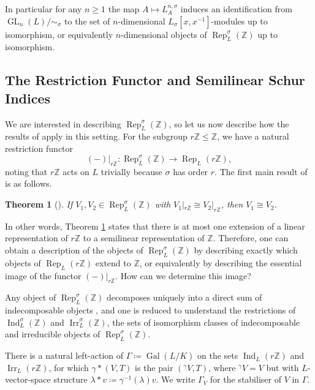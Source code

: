 \documentclass[10pt, reqno, hidelinks]{amsart}
\DeclareMathOperator{\Gal}{Gal}
\DeclareMathOperator{\Rep}{Rep}
\DeclareMathOperator{\Ind}{Ind}
\DeclareMathOperator{\Irr}{Irr}
\DeclareMathOperator{\GL}{GL}
\newcommand{\bZ}{{\mathbb Z}}
\newtheorem{thm}{Theorem}
\numberwithin{thm}{subsection}
\theoremstyle{definition}
\begin{document}
In particular for any $n \geq 1$ the map $A \mapsto L^{n, \sigma}_A$ induces an identification from $\GL_n(L) / \!\! \sim_{\sigma}$ to the set of $n$-dimensional $L_{\sigma}[x,x^{-1}]$-modules up to isomorphism, or equivalently $n$-dimensional objects of $\Rep_L^{\sigma}(\bZ)$ up to isomorphism.

\subsection{The Restriction Functor and Semilinear Schur Indices}\label{sect:backgroundsemilinearreps}

We are interested in describing $\Rep_L^{\sigma}(\bZ)$, so let us now describe how the results of \cite{TAYSchur} apply in this setting. For the subgroup $r \bZ \leq \bZ$, we have a natural restriction functor
\[
(-)|_{r \bZ} \colon \Rep_L^{\sigma}(\bZ) \rightarrow \Rep_L(r \bZ),
\]
noting that $r\bZ$ acts on $L$ trivially because $\sigma$ has order $r$. The first main result of \cite{TAYSchur} is as follows. 

\begin{thm}[{\cite[Theorem A]{TAYSchur}}]\label{thm:isomonrestrictions}
	If $V_1, V_2 \in \Rep_L^{\sigma}(\bZ)$ with $V_1|_{r\bZ} \cong V_2|_{r \bZ}$, then $V_1 \cong V_2$.
\end{thm}

In other words, Theorem \ref{thm:isomonrestrictions} states that there is at most one extension of a linear representation of $r \bZ$ to a semilinear representation of $\bZ$. Therefore, one can obtain a description of the objects of $\Rep_L^{\sigma}(\bZ)$ by describing exactly which objects of $\Rep_L(r \bZ)$ extend to $\bZ$, or equivalently by describing the essential image of the functor $(-)|_{r \bZ}$. How can we determine this image?

Any object of $\Rep_L^{\sigma}(\bZ)$ decomposes uniquely into a direct sum of indecomposable objects \cite[Lem.\ 2.14]{TAYSchur}, and one is reduced to understand the restrictions of $\Ind_L^{\sigma}(\bZ)$ and $\Irr_L^{\sigma}(\bZ)$, the sets of isomorphism classes of indecomposable and irreducible objects of $\Rep_L^{\sigma}(\bZ)$.

There is a natural left-action of $\Gamma \coloneqq \Gal(L/K)$ on the sets $\Ind_L(r \bZ)$ and $\Irr_L(r \bZ)$, for which $\gamma*(V,T)$ is the pair $({}^{\gamma} V, T)$, where ${}^{\gamma} V = V$ but with $L$-vector-space structure $\lambda * v \coloneqq \gamma^{-1}(\lambda)v$. We write $\Gamma_V$ for the stabiliser of $V$ in $\Gamma$.
\end{document}
